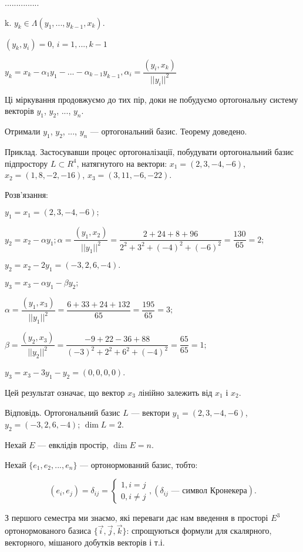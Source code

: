...............

k. $y_k \in \Lambda(y_1, ..., y_{k-1}, x_k)$.

$(y_k, y_i) = 0$, $i = 1, ..., k-1$

$y_k = x_k - \alpha_1 y_1 - ... - \alpha_{k-1} y_{k-1}, \alpha_i = \dfrac{(y_i, x_k)}{||y_i||^2}$

Ці міркування продовжуємо до тих пір, доки не побудуємо ортогональну
систему векторів $y_1$, $y_2$, ..., $y_n$.

Отримали $y_1$, $y_2$, ..., $y_n$ --- ортогональний базис. Теорему доведено.


Приклад. Застосувавши процес ортогоналізації, побудувати ортогональний
базис підпростору $L \subset R^4$, натягнутого на вектори: $x_1 = (2, 3, -4, -6)$,
$x_2 = (1, 8, -2, -16)$, $x_3 = (3,11, -6, -22)$.

Розв’язання:

$y_1 = x_1 = (2, 3, -4, -6);$

$y_2 = x_2 - \alpha y_1; \alpha = \dfrac{(y_1, x_2)}{||y_1||^2}
= \dfrac{2 + 24 + 8 + 96}{2^2 + 3^2 + (-4)^2 + (-6)^2} = \dfrac{130}{65} = 2;$

$y_2 = x_2 - 2 y_1 = (-3, 2, 6, -4).$

$y_3 = x_3 - \alpha y_1 - \beta y_2;$

$\alpha = \dfrac{(y_1, x_3)}{||y_1||^2}
= \dfrac{6 + 33 + 24 + 132}{65} = \dfrac{195}{65} = 3;$

$\beta = \dfrac{(y_2, x_3)}{||y_2||^2}
= \dfrac{-9 + 22 - 36 + 88}{(-3)^2 + 2^2 + 6^2 + (-4)^2} = \dfrac{65}{65} = 1;$

$y_3 = x_3 - 3 y_1 - y_2 = (0, 0, 0, 0)$.

Цей результат означає, що вектор $x_3$ лінійно залежить від $x_1$ і $x_2$.

Відповідь. Ортогональний базис $L$ --- вектори $y_1 = (2, 3, -4, -6)$,
$y_2 = (-3, 2, 6, -4)$; $\dim L = 2$.

Нехай $E$ --- евклідів простір, $\dim E = n$.

Нехай $\{e_1, e_2, ..., e_n\}$ --- ортонормований базис, тобто:

$$(e_i, e_j) = \delta_{ij} = \left\{ \begin{array}{l}
	1, i = j \\
	0, i \neq j
\end{array} \right., (\delta_{ij} \text{ --- символ Кронекера}).$$

З першого семестра ми знаємо, які переваги дає нам введення в просторі $E^3$
ортонормованого базиса $\{\overrightarrow{i}, \overrightarrow{j}, \overrightarrow{k} \}$:
спрощуються формули для скалярного, векторного, мішаного добутків векторів і т.і.

